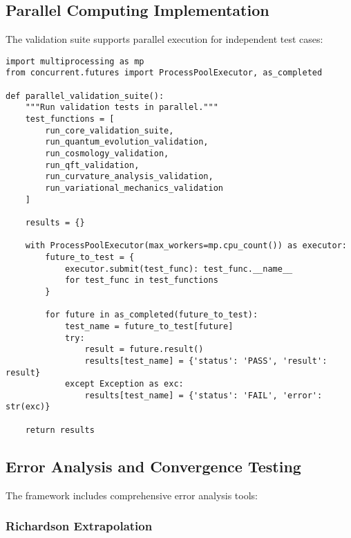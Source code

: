 \subsection{Parallel Computing Implementation}
\label{app:parallel_computing}

The validation suite supports parallel execution for independent test cases:

\begin{verbatim}
import multiprocessing as mp
from concurrent.futures import ProcessPoolExecutor, as_completed

def parallel_validation_suite():
    """Run validation tests in parallel."""
    test_functions = [
        run_core_validation_suite,
        run_quantum_evolution_validation,
        run_cosmology_validation,
        run_qft_validation,
        run_curvature_analysis_validation,
        run_variational_mechanics_validation
    ]
    
    results = {}
    
    with ProcessPoolExecutor(max_workers=mp.cpu_count()) as executor:
        future_to_test = {
            executor.submit(test_func): test_func.__name__
            for test_func in test_functions
        }
        
        for future in as_completed(future_to_test):
            test_name = future_to_test[future]
            try:
                result = future.result()
                results[test_name] = {'status': 'PASS', 'result': result}
            except Exception as exc:
                results[test_name] = {'status': 'FAIL', 'error': str(exc)}
    
    return results
\end{verbatim}

\subsection{Error Analysis and Convergence Testing}
\label{app:error_analysis}

The framework includes comprehensive error analysis tools:

\subsubsection{Richardson Extrapolation}

